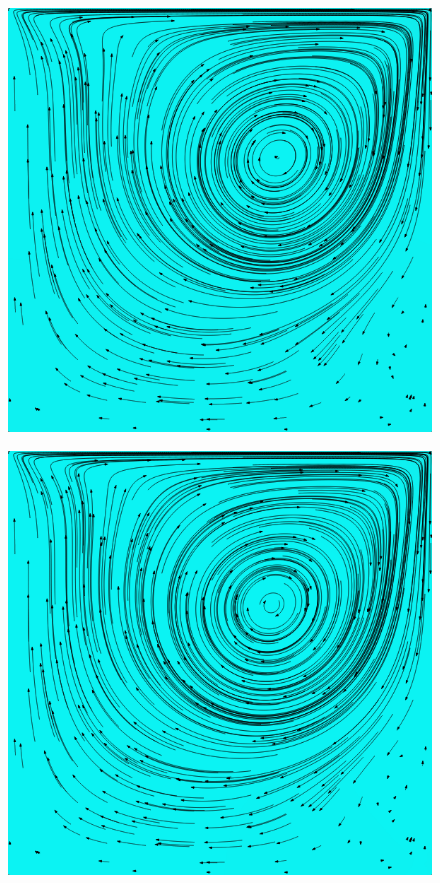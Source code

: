 		\begin{frame}
			\begin{figure}
				\centering
				\includegraphics[scale=0.4]{images/re-1000-512-07612.png}
			\end{figure}
		\end{frame}

		\begin{frame}
			\begin{figure}
				\centering
				\includegraphics[scale=0.4]{images/re-1000-512-08419.png}
			\end{figure}
		\end{frame}

